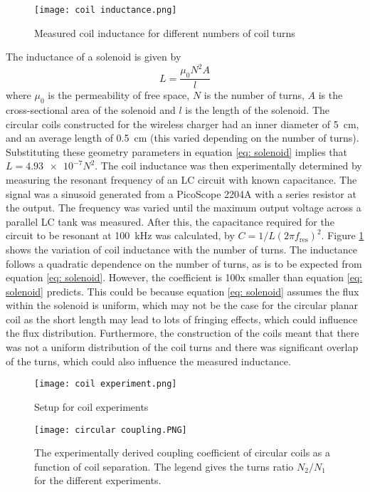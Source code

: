 \begin{figure}[htbp]
	\centering
	\texttt{[image: coil inductance.png]}
	\caption{Measured coil inductance for different numbers of coil turns}
	\label{fig: coil inductance}
\end{figure}

The inductance of a solenoid is given by 
\begin{equation}\label{eq: solenoid}
L = \frac{\mu_0 N^2 A}{l}
\end{equation}
where $\mu_0$ is the permeability of free space, $N$ is the number of turns, $A$ is the cross-sectional area of the solenoid and $l$ is the length of the solenoid. The circular coils constructed for the wireless charger had an inner diameter of \SI{5}{\centi\metre}, and an average length of \SI{0.5}{\centi\metre} (this varied depending on the number of turns). Substituting these geometry parameters in equation \ref{eq: solenoid} implies that $L=\num{4.93e-7}N^2$. The coil inductance was then experimentally determined by measuring the resonant frequency of an LC circuit with known capacitance. The signal was a sinusoid generated from a PicoScope 2204A \cite{picoscope} with a series resistor at the output. The frequency was varied until the maximum output voltage across a parallel LC tank was measured. After this, the capacitance required for the circuit to be resonant at \SI{100}{\kilo\hertz} was calculated, by $C = 1/L(2\pi f_\text{res})^2$. Figure \ref{fig: coil inductance} shows the variation of coil inductance with the number of turns. The inductance follows a quadratic dependence on the number of turns, as is to be expected from equation \ref{eq: solenoid}. However, the coefficient is 100x smaller than equation \ref{eq: solenoid} predicts. This could be because equation \ref{eq: solenoid} assumes the flux within the solenoid is uniform, which may not be the case for the circular planar coil as the short length may lead to lots of fringing effects, which could influence the flux distribution. Furthermore, the construction of the coils meant that there was not a uniform distribution of the coil turns and there was significant overlap of the turns, which could also influence the measured inductance.\\

\begin{figure}[htbp]
	\centering
	\texttt{[image: coil experiment.png]}
	\caption{Setup for coil experiments}
	\label{fig: coil experiment setup}
\end{figure}
\begin{figure}[htbp]
	\centering
	\texttt{[image: circular coupling.PNG]}
	\caption{The experimentally derived coupling coefficient of circular coils as a function of coil separation. The legend gives the turns ratio $N_2/N_1$ for the different experiments.}
	\label{fig: circular coupling}
\end{figure}


